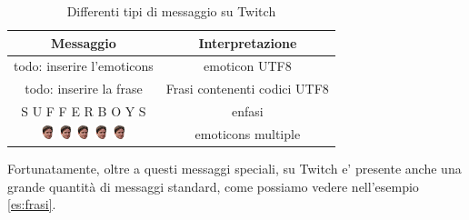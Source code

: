 \documentclass[a4paper,12pt,openright,twoside]{report}
\theoremstyle{definition}
\begin{document}
\begin{table}[h]
	\centering
	\begin{tabular}{|c|c|}
		\hline
		Messaggio & Interpretazione \\
		\hline
		\hline
		todo: inserire l'emoticons & emoticon UTF8 \\
		\hline
		todo: inserire la frase  & Frasi contenenti codici UTF8 \\
		\hline
		S U F F E R B O Y S & enfasi \\
		\hline
		\includegraphics[height=0.4cm, width=0.4cm]{Immagini/Emoticons/kappahd.png} \includegraphics[height=0.4cm, width=0.4cm]{Immagini/Emoticons/kappahd.png} \includegraphics[height=0.4cm, width=0.4cm]{Immagini/Emoticons/kappahd.png} \includegraphics[height=0.4cm, width=0.4cm]{Immagini/Emoticons/kappahd.png} \includegraphics[height=0.4cm, width=0.4cm]{Immagini/Emoticons/kappahd.png} & emoticons multiple \\
		\hline
	\end{tabular}
	\caption{Differenti tipi di messaggio su Twitch}
	\label{tab:messaggiTwitch}
\end{table}

Fortunatamente, oltre a questi messaggi speciali, su Twitch e'
presente anche una grande quantità di messaggi standard, come possiamo vedere nell'esempio \ref{es:frasi}.
\end{document}
